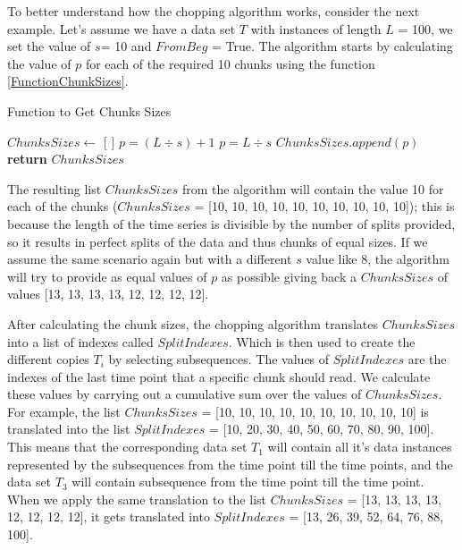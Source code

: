To better understand how the chopping algorithm works, consider the next example.
Let's assume we have a data set $T$ with instances of length $L$ = 100, we set the value of $s$= 10 and $FromBeg$ = True.
The algorithm starts by calculating the value of $p$ for each of the required 10 chunks using the function \ref{FunctionChunkSizes}.

\begin{algorithm}
    \caption{Function to Get Chunks Sizes}\label{FunctionChunkSizes}
    \begin{algorithmic}[1]
      \State $ChunksSizes \gets$ [ ]
                \State $p = (L \div{s}) + 1$
            \Else
                \State $p = L \div{s}$
            \EndIf
            \State $ChunksSizes.append(p)$
        \EndFor
        \State \textbf{return} $ChunksSizes$
      \EndFunction
    \end{algorithmic}
\end{algorithm}

The resulting list $ChunksSizes$ from the algorithm will contain the value 10 for each of the chunks ($ChunksSizes$ = [10, 10, 10, 10, 10, 10, 10, 10, 10, 10]);
this is because the length of the time series is divisible by the number of splits provided, so it results in perfect splits of the data and thus chunks of equal sizes.
If we assume the same scenario again but with a different $s$ value like 8, the algorithm will try to provide as equal values of $p$ as possible
giving back a $ChunksSizes$ of values [13, 13, 13, 13, 12, 12, 12, 12].

After calculating the chunk sizes, the chopping algorithm translates $ChunksSizes$ into a list of indexes called $SplitIndexes$.
Which is then used to create the different copies $T_{i}$ by selecting subsequences.
The values of $SplitIndexes$ are the indexes of the last time point that a specific chunk should read.
We calculate these values by carrying out a cumulative sum over the values of $ChunksSizes$.
For example, the list $ChunksSizes$ = [10, 10, 10, 10, 10, 10, 10, 10, 10, 10] is translated into the list $SplitIndexes$ = [10, 20, 30, 40, 50, 60, 70, 80, 90, 100].
This means that the corresponding data set $T_{1}$ will contain all it's data instances represented by the subsequences from the  time point till the  time points,
and the data set $T_{3}$ will contain subsequence from the  time point till the  time point.
When we apply the same translation to the list $ChunksSizes$ = [13, 13, 13, 13, 12, 12, 12, 12], it gets translated into $SplitIndexes$ = [13, 26, 39, 52, 64, 76, 88, 100].

